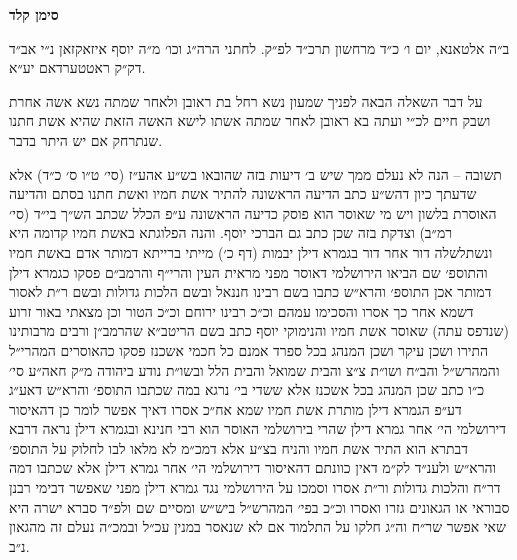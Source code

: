 \documentclass[12pt, openany]{book}
\newcommand{\chapname}{}
\newcommand{\newchap}[1]{
	\addcontentsline{toc}{chapter}{#1}
	\renewcommand{\chapname}{#1}
		\begin{center}
			\textbf{%
\fontsize{16pt}{16pt}\selectfont
				#1}
		\end{center}
}
\begin{document}
\newchap{סימן קלד}
\begin{multicols}{2}
ב״ה אלטאנא, יום ו׳ כ״ד מרחשון תרכ״ד לפ״ק. לחתני הרה״ג וכו׳ מ״ה יוסף איזאקזאן נ״י אב״ד דק״ק ראטטערדאם יע״א.\\\vspace{0pt}

על דבר השאלה הבאה לפניך שמעון נשא רחל בת ראובן ולאחר שמתה נשא אשה אחרת ושבק חיים לכ״י ועתה בא ראובן לאחר שמתה אשתו לישא האשה הזאת שהיא אשת חתנו שנתרחק אם יש היתר בדבר.\\\vspace{0pt}

תשובה – הנה לא נעלם ממך שיש ב׳ דיעות בזה שהובאו בש״ע אהע״ז (סי׳ ט״ו ס׳ כ״ד) אלא שדעתך כיון דהש״ע כתב הדיעה הראשונה להתיר אשת חמיו ואשת חתנו בסתם והדיעה האוסרת בלשון ויש מי שאוסר הוא פוסק כדיעה הראשונה ע״פ הכלל שכתב הש״ך בי״ד (סי׳ רמ״ב) וצדקת בזה שכן כתב גם הברכי יוסף. והנה הפלוגתא באשת חמיו קדומה היא ונשתלשלה דור אחר דור בגמרא דילן יבמות (דף כ׳) מייתי ברייתא דמותר אדם באשת חמיו והתוספ׳ שם הביאו הירושלמי דאוסר מפני מראית העין והרי״ף והרמב״ם פסקו כגמרא דילן דמותר אכן התוספ׳ והרא״ש כתבו בשם רבינו חננאל ובשם הלכות גדולות ובשם ר״ת לאסור דשמא אחר כך אסרו והסכימו עמהם וכ״כ רבינו ירוחם וכ״כ הטור וכן מצאתי באור זרוע (שנדפס עתה) שאוסר אשת חמיו והנימוקי יוסף כתב בשם הריטב״א שהרמב״ן ורבים מרבותינו התירו ושכן עיקר ושכן המנהג בכל ספרד אמנם כל חכמי אשכנז פסקו כהאוסרים המהרי״ל והמהרש״ל והב״ח ושו״ת צ״צ והבית שמואל והבית הלל ובשו״ת נודע ביהודה מ״ק חאה״ע סי׳ כ״ו כתב שכן המנהג בכל אשכנז אלא ששדי בי׳ נרגא במה שכתבו התוספ׳ והרא״ש דאע״ג דע״פ הגמרא דילן מותרת אשת חמיו שמא אח״כ אסרו דאיך אפשר לומר כן דהאיסור דירושלמי הי׳ אחר גמרא דילן שהרי בירושלמי האוסר הוא רבי חנינא ובגמרא דילן נראה דרבא דבתרא הוא התיר אשת חמיו והניח בצ״ע אלא דמכ״מ לא מלאו לבו לחלוק על התוספ׳ והרא״ש ולענ״ד לק״מ דאין כוונתם דהאיסור דירושלמי הי׳ אחר גמרא דילן אלא שכתבו דמה דר״ח והלכות גדולות ור״ת אסרו וסמכו על הירושלמי נגד גמרא דילן מפני שאפשר דבימי רבנן סבוראי או הגאונים גזרו ואסרו וכ״כ בפי׳ המהרש״ל ביש״ש ומסיים שם ולפ״ד סברא ישרה היא שאי אפשר שר״ח וה״ג חלקו על התלמוד אם לא שנאסר במנין עכ״ל ובמכ״ה נעלם זה מהגאון נ״ב.\\\vspace{0pt}


\end{multicols}
\end{document}
